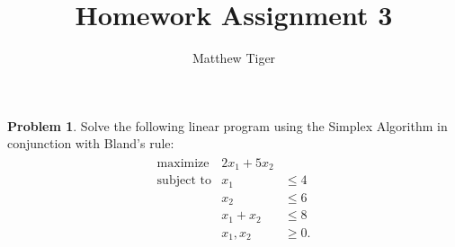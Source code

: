 \documentclass[12pt]{article}
\title{Homework Assignment 3}
\author{Matthew Tiger}
\theoremstyle{definition}
\newtheorem{problem}{Problem}
\begin{document}
\maketitle


\begin{problem}
  Solve the following linear program using the Simplex Algorithm in conjunction
  with Bland's rule:
  \begin{align*}
    \begin{array}{rrl}
      \text{maximize} & 2x_1 + 5x_2 &\\
      \text{subject to} & x_1 &\leq 4 \\
      & x_2 &\leq 6 \\
      & x_1 + x_2 &\leq 8 \\
      & x_1, x_2 &\geq 0.
    \end{array}
  \end{align*}
\end{problem}
\end{document}
